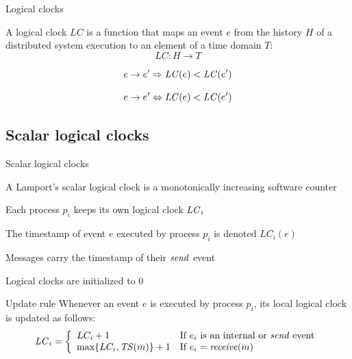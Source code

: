 \begin{frame}{Logical clocks}

\begin{definition}
A logical clock $LC$ is a function that maps an event $e$ from the history $H$ 
of a distributed system execution to an element of a time domain $T$:
\[
  LC: H \rightarrow T
\]
\end{definition}

\begin{definition}

\[ e \rightarrow e' \Rightarrow \mathit{LC}(e) < \mathit{LC}(e')  \]

\end{definition}

\begin{definition}

\[ e \rightarrow e' \Leftrightarrow \mathit{LC}(e) < \mathit{LC}(e')  \]

\end{definition}

\end{frame}


\subsection{Scalar logical clocks}

\begin{frame}{Scalar logical clocks}

\begin{definition}
\BI
\item A Lamport's \alert{scalar} logical clock is a monotonically increasing software counter
\item Each process $p_i$ keeps its own logical clock $\mathit{LC}_i$
\item The \alert{timestamp} of event $e$ executed by process $p_i$ is denoted $LC_i(e)$
\item Messages carry the \alert{timestamp} of their $\mathit{send}$ event
\item Logical clocks are initialized to 0
\EI
\end{definition}

% 

\begin{block}{Update rule}
Whenever an event $e$ is executed by process $p_i$, its local logical clock is updated
as follows:
\[
\mathit{LC}_i = \left\{ 
  \begin{array}{ll}
     LC_i + 1  & \mbox{If $e_i$ is an internal or $\mathit{send}$ event} \\
     \max \{ LC_i, \mathit{TS}(m) \} + 1 & \mbox{If $e_i = \mathit{receive}(m)$}
  \end{array} 
\right.
\]
\end{block}
\end{frame}

